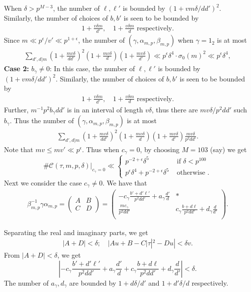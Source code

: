 \documentclass[11pt]{amsart}
\numberwithin{equation}{section}
\theoremstyle{plain}
\theoremstyle{definition}
\newcommand{\mc}{\mathcal}
\newcommand{\q}{\quad}
\newcommand{\sumn}{\sum \nolimits}
\newcommand{\smat}[4]{\left( \begin{smallmatrix}#1&#2\\#3&#4\end{smallmatrix}\right)}
\newcommand{\pmat}[4]{\begin{pmatrix} #1 & #2 \\ #3 & #4 \\ \end{pmatrix} }
\begin{document}
When $\delta> p^{M-3}$, the number of $\ell, \ell'$ is bounded by $(1+v m\delta/dd')^2$. Similarly, the number of choices of $b ,b'$ is seen to be bounded by 
\begin{align}
  1+ \frac{v \delta m}{d'}, \q   1+ \frac{v \delta m}{d} \text{ respectively.}
\end{align}
Since $m \ll p^{\epsilon}/v' \ll p^{1+\epsilon}$, the number of $(\gamma, \alpha_{m,p}, \beta_{m,p})$ when $\gamma =1_2$ is at most
\begin{align}
    \sumn_{d',d|m} (1+\frac{mv \delta }{dd'} )^2(1+\frac{mv \delta }{d} ) (1+\frac{mv \delta }{d'} )\ll p^\epsilon \delta^4 \cdot \sigma_0(m)^2\ll p^\epsilon \delta^4,
\end{align}
\textbf{Case 2:} $b_\gamma\neq 0$: In this case, the number of $\ell, \ell'$ is bounded by $(1+v m\delta/dd')^2$. Similarly, the number of choices of $b ,b'$ is seen to be bounded by 
\begin{align}
  1+ \frac{v \delta m}{d'}, \q   1+ \frac{v \delta m}{d} \text{ respectively.}
\end{align}
Further, $m^{-1}p^2b_\gamma dd'$ is in an interval of length $v\delta$, thus there are $mv\delta/p^2dd'$ such $b_\gamma$. Thus the number of $(\gamma, \alpha_{m,p}, \beta_{m,p})$ is at most
\begin{align}
    \sumn_{d',d|m} (1+\frac{mv \delta }{dd'} )^2(1+\frac{mv \delta }{d} ) (1+\frac{mv \delta }{d'} )\frac{mv \delta }{p^2dd'} .
\end{align}
Note that $mv\le mv' \ll p^\epsilon$. Thus when $c_\gamma=0$, by choosing $M= 103$ (say) we get
\begin{equation}
    \# \mc C(\tau, m,p, \delta)|_{c_\gamma=0}\ll \begin{cases}
        p^{-2+\epsilon}\delta^5 & \text{ if } \delta< p^{100}\\
        p^\epsilon \delta^4+ p^{-2+\epsilon}\delta^5 & \text{ otherwise }.
    \end{cases}
\end{equation}
Next we consider the case $c_\gamma\neq 0$. We have that
\begin{align} \label{g-defold}
\beta_{m,p}^{-1}\gamma\alpha_{m,p}=\smat{A}{B}{C}{D} = \pmat{-c_\gamma  \frac{b'+d'\ell'}{p^2dd'} + a_\gamma  \frac{d'}{d}}{*}{\frac{mc_\gamma }{p^2dd'}}{c_\gamma\frac{ b+d\ell }{p^2dd'}+ d_\gamma \frac{d}{d'}}.
\end{align}

Separating the real and imaginary parts, we get
\begin{align}
    |A+D|< \delta ;\q |Au+B-C|\tau|^2-Du|< \delta v .
\end{align}
From $|A+D|<\delta$, we get
\begin{equation} \label{abcold}
    \left|-c_\gamma  \frac{b'+d'\ell'}{p^2dd'} + a_\gamma  \frac{d'}{d}+c_\gamma\frac{ b+d\ell }{p^2dd'}+ d_\gamma \frac{d}{d'}\right|<\delta.
\end{equation}
The number of $a_\gamma, d_\gamma$ are bounded by $1+d\delta/d'$ and $1+d'\delta/d$ respectively.
\end{document}
